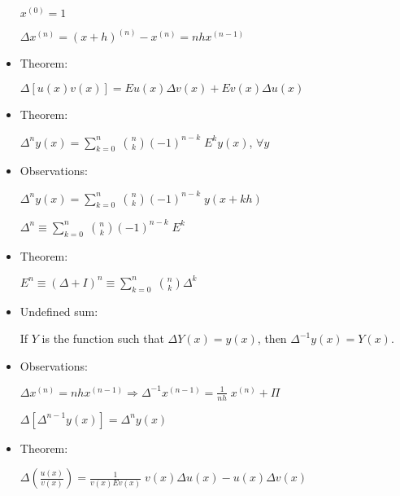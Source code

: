 \documentclass{article}
\begin{document}
\begin{itemize}
$x^{(0)} = 1$

$\Delta x^{(n)} = (x + h)^{(n)} - x^{(n)} = nhx^{(n-1)}$

\item Theorem:

$\Delta [u(x)v(x)] = Eu(x) \Delta v(x) + Ev(x) \Delta u(x)$

\item Theorem:

$\Delta^{n} y(x) = \sum\limits_{k = 0}^{n} \; \binom{n}{k} (-1)^{n - k} \; E^{k} y(x)$, $\forall y$

\item Observations:

$\Delta^{n} y(x) = \sum\limits_{k = 0}^{n} \; \binom{n}{k} (-1)^{n - k} \; y(x + kh)$

$\Delta^{n} \equiv \sum\limits_{k = 0}^{n} \; \binom{n}{k} (-1)^{n - k} \; E^{k}$

\item Theorem:

$E^{n} \equiv (\Delta + I)^{n} \equiv \sum\limits_{k = 0}^{n} \; \binom{n}{k} \Delta^{k}$

\item Undefined sum:

If $Y$ is the function such that $\Delta Y(x) = y(x)$, then $\Delta^{-1} y(x) = Y(x)$.

\item Observations:

$\Delta x^{(n)} = nhx^{(n - 1)} \Rightarrow \Delta^{-1} x^{(n - 1)} = \frac{1}{nh} \; x^{(n)} + \Pi$

$\Delta [\Delta^{n - 1} y(x)] = \Delta^{n} y(x)$

\item Theorem:

$\Delta (\frac{u(x)}{v(x)}) = \frac{1}{v(x) Ev(x)} \; v(x) \Delta u(x) - u(x) \Delta v(x)$
    
\end{itemize}
\end{document}
